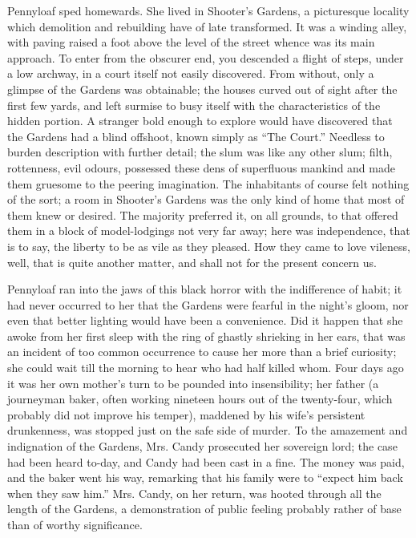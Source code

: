 {}Pennyloaf sped homewards. She lived in Shooter's Gardens, a
picturesque locality which demolition and rebuilding have of late
transformed. It was a winding alley, with paving raised a foot above the
level of the street whence was its main approach. To enter from the
obscurer end, you descended a flight of steps, under a low archway, in a
court itself not easily discovered. From without, only a glimpse of the
Gardens was obtainable; the houses curved out of sight after the first
few yards, and left surmise to busy itself with the characteristics of
the hidden portion. A stranger bold enough to explore would have
discovered that the Gardens had a blind offshoot, known simply as ``The
Court.'' Needless to burden description with further detail; the slum
was like any other slum; filth, rottenness, evil odours, possessed these
dens of superfluous mankind and made them gruesome to the peering
imagination. The inhabitants of course felt nothing of the sort; a room
in Shooter's Gardens was the only kind of home that {}most of them knew
or desired. The majority preferred it, on all grounds, to that offered
them in a block of model-lodgings not very far away; here was
independence, that is to say, the liberty to be as vile as they pleased.
How they came to love vileness, well, that is quite another matter, and
shall not for the present concern us.

Pennyloaf ran into the jaws of this black horror with the indifference
of habit; it had never occurred to her that the Gardens were fearful in
the night's gloom, nor even that better lighting would have been a
convenience. Did it happen that she awoke from her first sleep with the
ring of ghastly shrieking in her ears, that was an incident of too
common occurrence to cause her more than a brief curiosity; she could
wait till the morning to hear who had half killed whom. Four days ago it
was her own mother's turn to be pounded into insensibility; her father
(a journeyman baker, often working nineteen hours out of the
twenty-four, which probably did not improve his temper), maddened by
{}his wife's persistent drunkenness, was stopped just on the safe side
of murder. To the amazement and indignation of the Gardens, Mrs. Candy
prosecuted her sovereign lord; the case had been heard to-day, and Candy
had been cast in a fine. The money was paid, and the baker went his way,
remarking that his family were to ``expect him back when they saw him.''
Mrs. Candy, on her return, was hooted through all the length of the
Gardens, a demonstration of public feeling probably rather of base than
of worthy significance.

